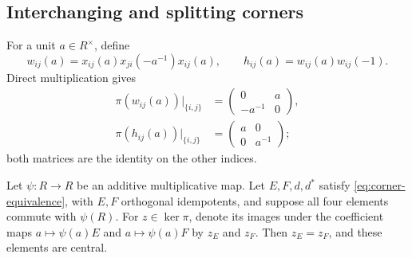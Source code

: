\subsection{Interchanging and splitting corners}

For a unit $a\in R^\times$, define
\[
 w_{ij}(a)=x_{ij}(a)x_{ji}(-a^{-1})x_{ij}(a),\qquad
 h_{ij}(a)=w_{ij}(a)w_{ij}(-1).
\]
Direct multiplication gives
\begin{equation}\label{eq:balanced-diagonal}
 \begin{aligned}
 \pi(w_{ij}(a))\big|_{\{i,j\}}
   &=\begin{pmatrix}0&a\\-a^{-1}&0\end{pmatrix},\\
 \pi(h_{ij}(a))\big|_{\{i,j\}}
   &=\begin{pmatrix}a&0\\0&a^{-1}\end{pmatrix};
 \end{aligned}
\end{equation}
both matrices are the identity on the other indices.

\begin{lemma}\label{lem:corner-comparison}
Let $\psi:R\to R$ be an additive multiplicative map.  Let $E,F,d,d^*$
satisfy \eqref{eq:corner-equivalence}, with $E,F$ orthogonal
idempotents, and suppose all four elements commute with $\psi(R)$.
For $z\in\ker\pi$, denote its images under the coefficient maps
$a\mapsto\psi(a)E$ and $a\mapsto\psi(a)F$ by $z_E$ and $z_F$.
Then $z_E=z_F$, and these elements are central.
\end{lemma}

